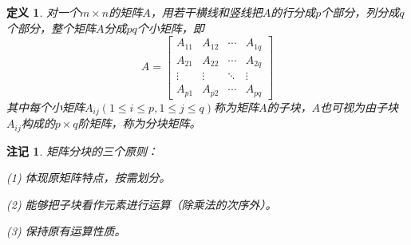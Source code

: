 \documentclass[a4paper]{book}
\newtheorem{Def}{定义}[chapter]
\newtheorem{rmk}{注记}[chapter]
\newcommand{\enum}{\begin{list}{}{\setlength{\leftmargin}{0pt} \setlength{\itemindent}{2.5em} \setlength{\listparindent}{2em}}}
\begin{document}
\begin{Def}
对一个$m\times n$的矩阵$A$，用若干横线和竖线把$A$的行分成$p$个部分，列分成$q$个部分，整个矩阵$A$分成$pq$个小矩阵，即
$$A = \begin{bmatrix}
A_{11} & A_{12} & \cdots & A_{1q} \\
A_{21} & A_{22} & \cdots & A_{2q} \\
\vdots & \vdots & \ddots & \vdots \\
A_{p1} & A_{p2} & \cdots & A_{pq}
\end{bmatrix}$$
其中每个小矩阵$A_{ij}(1 \leqslant i \leqslant p, 1 \leqslant j \leqslant q)$称为矩阵$A$的子块，$A$也可视为由子块$A_{ij}$构成的$p\times q$阶矩阵，称为分块矩阵。
\end{Def}

\begin{rmk}
矩阵分块的三个原则：
\enum
\item[(1)] 体现原矩阵特点，按需划分。
\item[(2)] 能够把子块看作元素进行运算（除乘法的次序外）。
\item[(3)] 保持原有运算性质。
\end{list}
\end{rmk}
\end{document}
